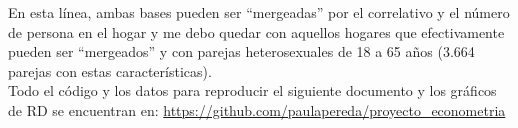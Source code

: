 \documentclass[15pt]{article}
\begin{document}
En esta línea, ambas bases pueden ser ``mergeadas'' por el correlativo y el número de persona en el hogar y me debo quedar con aquellos hogares que efectivamente pueden ser ``mergeados'' y con parejas heterosexuales de 18 a 65 años (3.664 parejas con estas características).\\ 

Todo el código y los datos para reproducir el siguiente documento y los gráficos de RD se encuentran en: \url{https://github.com/paulapereda/proyecto_econometria}



\nocite{*}
\end{document}
